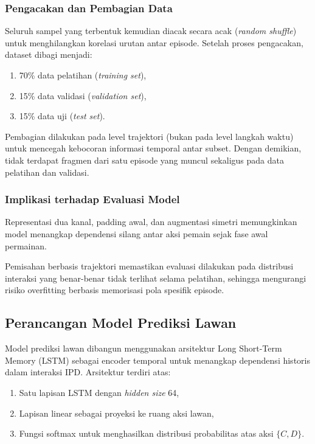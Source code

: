 \subsubsection{Pengacakan dan Pembagian Data}

Seluruh sampel yang terbentuk kemudian diacak secara acak (\textit{random shuffle}) untuk menghilangkan korelasi urutan antar episode. Setelah proses pengacakan, dataset dibagi menjadi:

\begin{enumerate}
    \item 70\% data pelatihan (\textit{training set}),
    \item 15\% data validasi (\textit{validation set}),
    \item 15\% data uji (\textit{test set}).
\end{enumerate}

Pembagian dilakukan pada level trajektori (bukan pada level langkah waktu) untuk mencegah kebocoran informasi temporal antar subset. Dengan demikian, tidak terdapat fragmen dari satu episode yang muncul sekaligus pada data pelatihan dan validasi.

\subsubsection{Implikasi terhadap Evaluasi Model}

Representasi dua kanal, padding awal, dan augmentasi simetri memungkinkan model menangkap dependensi silang antar aksi pemain sejak fase awal permainan. 

Pemisahan berbasis trajektori memastikan evaluasi dilakukan pada distribusi interaksi yang benar-benar tidak terlihat selama pelatihan, sehingga mengurangi risiko overfitting berbasis memorisasi pola spesifik episode.

\subsection{Perancangan Model Prediksi Lawan}

Model prediksi lawan dibangun menggunakan arsitektur Long Short-Term Memory (LSTM) sebagai encoder temporal untuk menangkap dependensi historis dalam interaksi IPD. Arsitektur terdiri atas:

\begin{enumerate}
    \item Satu lapisan LSTM dengan \textit{hidden size} 64,
    \item Lapisan linear sebagai proyeksi ke ruang aksi lawan,
    \item Fungsi softmax untuk menghasilkan distribusi probabilitas atas aksi $\{C, D\}$.
\end{enumerate}

